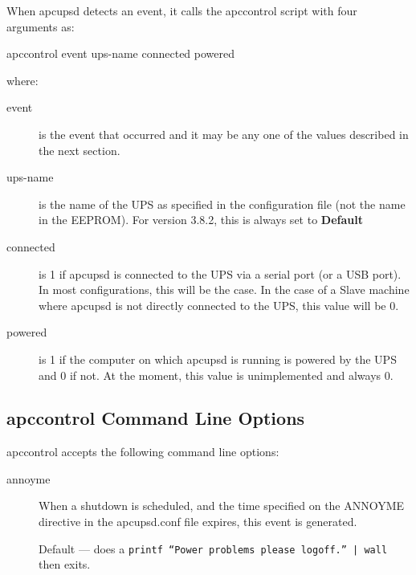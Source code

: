 {{{{{{When apcupsd detects an event, it calls the apccontrol script with four
arguments as:  

apccontrol \lt{}event\gt{} \lt{}ups-name\gt{} \lt{}connected\gt{}
\lt{}powered\gt{}  

where:  

\begin{description}

\item [event]
   is the event that occurred and it may be any one of the values described in
the next section.  

\item [ups-name]
   is the name of the UPS as specified in the configuration file (not the name in
the EEPROM). For version 3.8.2, this is always set to {\bf Default}  

\item [connected]
   is 1 if apcupsd is connected to the UPS via a serial port (or a USB port). In
most configurations, this will be the case. In the case of a Slave machine
where apcupsd is not directly connected to the UPS, this value will be 0.  

\item [powered]
   is 1 if the computer on which apcupsd is running is powered by the UPS and 0
if not.  At the moment, this value is unimplemented and always 0. 
\end{description}

\label{apccontrol-Command-Line-Options}

\subsection*{apccontrol Command Line Options}

apccontrol accepts the following command line options:  

\begin{description}

\item [annoyme]
   When a shutdown is scheduled, and the time specified on the ANNOYME directive
in the apcupsd.conf file expires, this event is generated.  

Default {---} does a {\tt printf ``Power problems please logoff.'' | wall}
then exits.  


\end{description}}}}}}}
